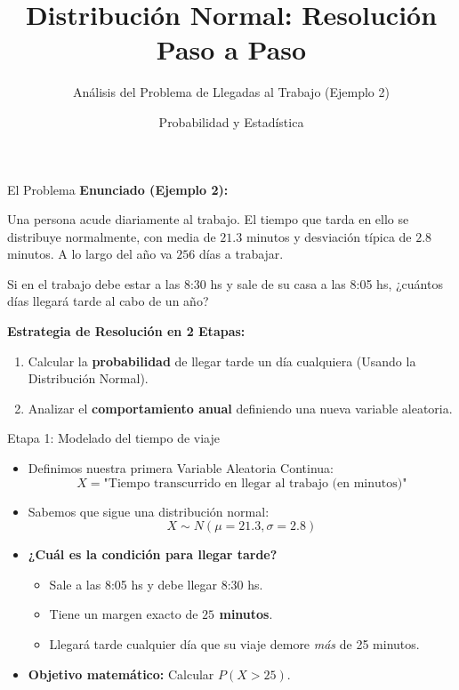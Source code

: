 \documentclass[11pt, aspectratio=169]{beamer}
\title{Distribución Normal: Resolución Paso a Paso}
\subtitle{Análisis del Problema de Llegadas al Trabajo (Ejemplo 2)}
\author{Probabilidad y Estadística}
\date{}
\begin{document}
\begin{frame}
    \titlepage
\end{frame}

\begin{frame}{El Problema}
    \textbf{Enunciado (Ejemplo 2):}
    \vspace{0.3cm}
    
    Una persona acude diariamente al trabajo. El tiempo que tarda en ello se distribuye normalmente, con media de $21.3$ minutos y desviación típica de $2.8$ minutos. A lo largo del año va $256$ días a trabajar.
    
    \vspace{0.3cm}
    Si en el trabajo debe estar a las 8:30 hs y sale de su casa a las 8:05 hs, ¿cuántos días llegará tarde al cabo de un año?
    
    \vspace{0.5cm}
    \textbf{Estrategia de Resolución en 2 Etapas:}
    \begin{enumerate}
        \item Calcular la \textbf{probabilidad} de llegar tarde un día cualquiera (Usando la Distribución Normal).
        \item Analizar el \textbf{comportamiento anual} definiendo una nueva variable aleatoria.
    \end{enumerate}
\end{frame}

\begin{frame}{Etapa 1: Modelado del tiempo de viaje}
    \begin{itemize}
        \item Definimos nuestra primera Variable Aleatoria Continua:
        \begin{equation*}
            X = \text{"Tiempo transcurrido en llegar al trabajo (en minutos)"}
        \end{equation*}
        \item Sabemos que sigue una distribución normal: 
        \begin{equation*}
            X \sim N(\mu = 21.3, \sigma = 2.8)
        \end{equation*}
        \item \textbf{¿Cuál es la condición para llegar tarde?}
        \begin{itemize}
            \item Sale a las 8:05 hs y debe llegar 8:30 hs.
            \item Tiene un margen exacto de \textbf{$25$ minutos}.
            \item Llegará tarde cualquier día que su viaje demore \textit{más} de 25 minutos.
        \end{itemize}
        \item \textbf{Objetivo matemático:} Calcular $P(X > 25)$.
    \end{itemize}
\end{frame}
\end{document}
